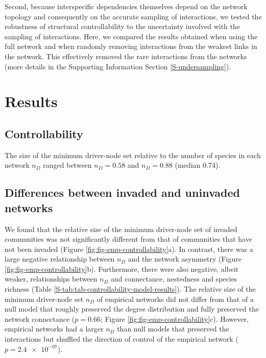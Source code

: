 \documentclass[a4paper]{artikel1}
\theoremstyle{definition}
\theoremstyle{definition}
\theoremstyle{definition}
\theoremstyle{remark}
\begin{document}
Second, because interspecific dependencies themselves depend on the
network topology and consequently on the accurate sampling of
interactions, we tested the robustness of structural controllability to
the uncertainty involved with the sampling of interactions. Here, we
compared the results obtained when using the full network and when
randomly removing interactions from the weakest links in the network.
This effectively removed the rare interactions from the networks (more
details in the Supporting Information Section \ref{S-undersampling}).

\section{Results}\label{results}

\subsection{Controllability}\label{controllability-1}

The size of the minimum driver-node set relative to the number of
species in each network \(n_D\) ranged between \(n_D = 0.58\) and
\(n_D = 0.88\) (median 0.74).

\subsection{Differences between invaded and uninvaded
networks}\label{differences-between-invaded-and-uninvaded-networks-1}

We found that the relative size of the minimum driver-node set of
invaded communities was not significantly different from that of
communities that have not been invaded (Figure
\ref{fig:fig-emp-controllability}a). In contrast, there was a large
negative relationship between \(n_D\) and the network asymmetry (Figure
\ref{fig:fig-emp-controllability}b). Furthermore, there were also
negative, albeit weaker, relationships between \(n_D\) and connectance,
nestedness and species richness (Table
\ref{S-tab:tab-controllability-model-results}). The relative size of the
minimum driver-node set \(n_D\) of empirical networks did not differ
from that of a null model that roughly preserved the degree distribution
and fully preserved the network connectance (\(p = \num{0.66}\); Figure
\ref{fig:fig-emp-controllability}c). However, empirical networks had a
larger \(n_D\) than null models that preserved the interactions but
shuffled the direction of control of the empirical network
(\(p = \num{2.4e-07}\)).
\end{document}
